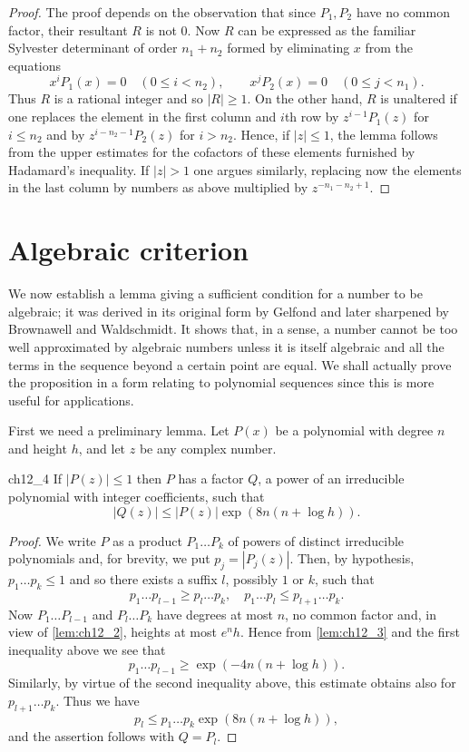 \begin{proof}
The proof depends on the observation that since $P_1, P_2$ have no common factor, their resultant $R$ is not 0. Now $R$ can be expressed as the familiar Sylvester determinant of order $n_1 + n_2$ formed by eliminating $x$ from the equations
\[x^i P_1(x) = 0 \quad (0 \leqslant i < n_2), \qquad x^j P_2(x) = 0 \quad (0 \leqslant j < n_1).\]
Thus $R$ is a rational integer and so $|R| \ge 1$. On the other hand, $R$ is unaltered if one replaces the element in the first column and $i$th row by $z^{i-1}P_1(z)$ for $i \le n_2$ and by $z^{i-n_2-1}P_2(z)$ for $i > n_2$. Hence, if $|z| \le 1$, the lemma follows from the upper estimates for the cofactors of these elements furnished by Hadamard's inequality. If $|z| > 1$ one argues similarly, replacing now the elements in the last column by numbers as above multiplied by $z^{-n_1-n_2+1}$.
\end{proof}

\section{Algebraic criterion}

We now establish a lemma giving a sufficient condition for a number to be algebraic; it was derived in its original form by Gelfond and later sharpened by Brownawell and Waldschmidt. It shows that, in a sense, a number cannot be too well approximated by algebraic numbers unless it is itself algebraic and all the terms in the sequence beyond a certain point are equal. We shall actually prove the proposition in a form relating to polynomial sequences since this is more useful for applications.

First we need a preliminary lemma. Let $P(x)$ be a polynomial with degree $n$ and height $h$, and let $z$ be any complex number.

\begin{mylemma}{}{ch12_4}
If $|P(z)| \le 1$ then $P$ has a factor $Q$, a power of an irreducible polynomial with integer coefficients, such that
\[|Q(z)| \leq |P(z)| \exp(8n(n + \log h)).\]
\end{mylemma}

\begin{proof}
We write $P$ as a product $P_1 \dots P_k$ of powers of distinct irreducible polynomials and, for brevity, we put $p_j = |P_j(z)|$. Then, by hypothesis, $p_1 \dots p_k \le 1$ and so there exists a suffix $l$, possibly $1$ or $k$, such that
\[p_1 \dots p_{l-1} \geqslant p_l \dots p_k, \quad p_1 \dots p_l \leqslant p_{l+1} \dots p_k.\]
Now $P_1 \dots P_{l-1}$ and $P_l \dots P_k$ have degrees at most $n$, no common factor and, in view of \autoref{lem:ch12_2}, heights at most $e^n h$. Hence from \autoref{lem:ch12_3} and the first inequality above we see that
\[p_1 \dots p_{l-1} \geqslant \exp(-4n(n + \log h)).\]
Similarly, by virtue of the second inequality above, this estimate obtains also for $p_{l+1} \dots p_k$. Thus we have
\[p_l \leq p_1 \dots p_k \exp(8n(n + \log h)),\]
and the assertion follows with $Q = P_l$.
\end{proof}

